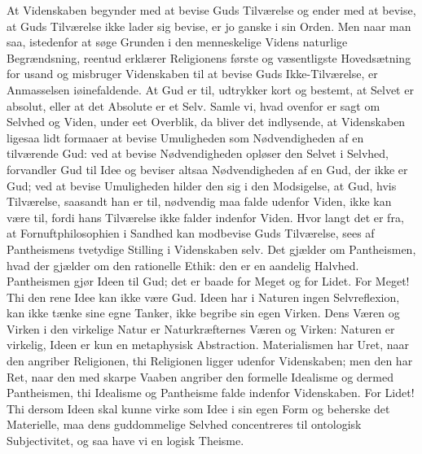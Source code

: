\documentclass[12pt]{book}
\begin{document}
At Videnskaben begynder med at bevise Guds Tilværelse og ender med
at bevise, at Guds Tilværelse ikke lader sig bevise, er jo ganske i
sin Orden. Men naar man saa, istedenfor at søge Grunden i den
menneskelige Videns naturlige Begrændsning, reentud erklærer
Religionens første og væsentligste Hovedsætning for usand og
misbruger Videnskaben til at bevise Guds Ikke-Tilværelse, er
Anmasselsen iøinefaldende. At Gud er til, udtrykker kort og
bestemt, at Selvet er absolut, eller at det Absolute er et Selv.
Samle vi, hvad ovenfor er sagt om Selvhed og Viden, under eet
Overblik, da bliver det indlysende, at Videnskaben ligesaa lidt
formaaer at bevise Umuligheden som Nødvendigheden af en tilværende
Gud:
ved at bevise Nødvendigheden opløser den Selvet i Selvhed,
forvandler Gud til Idee og beviser altsaa Nødvendigheden af en Gud,
der ikke er Gud; ved at bevise Umuligheden hilder den sig i den
Modsigelse, at Gud, hvis Tilværelse, saasandt han er til, nødvendig
maa falde udenfor Viden, ikke kan være til, fordi hans Tilværelse
ikke falder indenfor Viden. Hvor langt det er fra, at
Fornuftphilosophien i Sandhed kan modbevise Guds Tilværelse, sees af
Pantheismens tvetydige Stilling i Videnskaben selv. Det gjælder om
Pantheismen, hvad der gjælder om den rationelle Ethik: den er en
aandelig Halvhed. Pantheismen gjør Ideen til Gud; det er baade for
Meget og for Lidet. For Meget! Thi den rene Idee kan ikke være Gud.
Ideen har i Naturen ingen Selvreflexion, kan ikke tænke sine egne
Tanker, ikke begribe sin egen Virken. Dens Væren og Virken i den
virkelige Natur er Naturkræfternes Væren og Virken: Naturen er
virkelig, Ideen er kun en metaphysisk Abstraction. Materialismen har
Uret, naar den angriber Religionen, thi Religionen ligger udenfor
Videnskaben; men den har Ret, naar den med skarpe Vaaben angriber
den formelle Idealisme og dermed Pantheismen, thi Idealisme og
Pantheisme falde indenfor Videnskaben. For Lidet! Thi dersom Ideen
skal kunne virke som Idee i sin egen Form og beherske det
Materielle, maa dens guddommelige Selvhed concentreres til
ontologisk Subjectivitet, og saa have vi en logisk Theisme.
\end{document}

